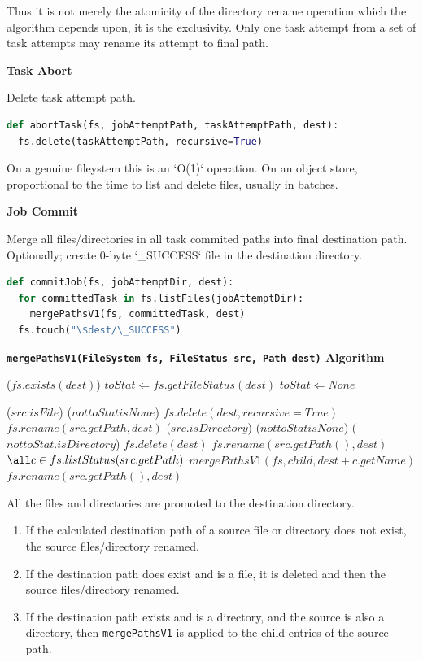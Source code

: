 \documentclass[conference]{IEEEtran}
\begin{document}
Thus it is not merely the atomicity of the directory rename operation
which the algorithm depends upon, it is the exclusivity.
Only one task attempt from a set of task attempts may rename its attempt to
final path.

\textbf{Task Abort}

Delete task attempt path.

\begin{lstlisting}[language=Python]
def abortTask(fs, jobAttemptPath, taskAttemptPath, dest):
  fs.delete(taskAttemptPath, recursive=True)
\end{lstlisting}

On a genuine fileystem this is an `O(1)` operation.
On an object store,
proportional to the time to list and delete files, usually in batches.


\textbf{Job Commit}

Merge all files/directories in all task commited paths into final destination path.
Optionally;
create 0-byte `\_SUCCESS` file in the destination directory.

\begin{lstlisting}[language=Python]
def commitJob(fs, jobAttemptDir, dest):
  for committedTask in fs.listFiles(jobAttemptDir):
    mergePathsV1(fs, committedTask, dest)
  fs.touch("\$dest/\_SUCCESS")
\end{lstlisting}

\textbf{\texttt{mergePathsV1(FileSystem fs, FileStatus src, Path dest)} Algorithm}

\begin{algorithmic}
\IF ($fs.exists(dest)$)
  \STATE $toStat \Leftarrow fs.getFileStatus(dest)$
\ELSE
  \STATE $toStat \Leftarrow None$
\ENDIF

\IF ($src.isFile$)
  \IF ($not toStat is None$)
    $fs.delete(dest, recursive = True)$
  \ENDIF
  $fs.rename(src.getPath, dest)$
\ELSE
  \IF ($src.isDirectory$)
    \IF ($not toStat is None$)
      \IF ($not toStat.isDirectory$)
        $fs.delete(dest)$
        $fs.rename(src.getPath(), dest)$
      \ELSE
        \FOR $\all c \in fs.listStatus(src.getPath)$
          $mergePathsV1(fs, child, dest + c.getName)$
        \ENDFOR
      \ENDIF
    \ENDIF
  \ENDIF
\ELSE
  $fs.rename(src.getPath(), dest)$
\ENDIF

\end{algorithmic}


All the files and directories are promoted to the destination directory.

\begin{enumerate}
  \item If the calculated destination path of a source file or directory does
  not exist, the source files/directory renamed.
  \item If the destination path does exist and is a file, it is deleted and then
  the source files/directory renamed.
  \item If the destination path exists and is a directory, and the source
  is also a directory, then \texttt{mergePathsV1} is applied to the child
  entries of the source path.
\end{enumerate}
\end{document}
